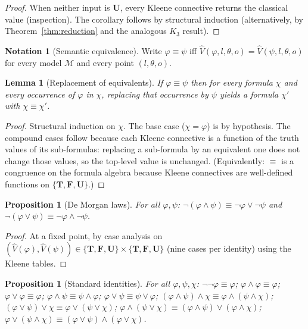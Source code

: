 \documentclass[11pt,a4paper]{article}
\theoremstyle{definition}
\newtheorem{notation}[definition]{Notation}
\theoremstyle{plain}
\newtheorem{lemma}[definition]{Lemma}
\newtheorem{proposition}[definition]{Proposition}
\theoremstyle{remark}
\newcommand{\Tv}{\mathbf{T}}
\newcommand{\Fv}{\mathbf{F}}
\newcommand{\Uv}{\mathbf{U}}
\newcommand{\Vals}{\{\Tv, \Fv, \Uv\}}
\newcommand{\Vh}{\widehat{V}}
\newcommand{\frm}{(l, \theta, o)}
\newcommand{\eqv}{\equiv}
\newcommand{\Mod}{\mathcal{M}}
\begin{document}
\begin{proof}
When neither input is $\Uv$, every Kleene connective returns the
classical value (inspection). The corollary follows by structural
induction (alternatively, by Theorem~\ref{thm:reduction} and the
analogous $K_3$ result).
\end{proof}

\begin{notation}[Semantic equivalence]
Write $\varphi \eqv \psi$ iff $\Vh(\varphi, l, \theta, o) =
\Vh(\psi, l, \theta, o)$ for every model $\Mod$ and every point $\frm$.
\end{notation}

\begin{lemma}[Replacement of equivalents]
\label{lem:replace}
If $\varphi \eqv \psi$ then for every formula $\chi$ and every occurrence
of $\varphi$ in $\chi$, replacing that occurrence by $\psi$ yields a
formula $\chi'$ with $\chi \eqv \chi'$.
\end{lemma}

\begin{proof}
Structural induction on $\chi$. The base case ($\chi = \varphi$) is by
hypothesis. The compound cases follow because each Kleene connective is
a function of the truth values of its sub-formulas: replacing a
sub-formula by an equivalent one does not change those values, so the
top-level value is unchanged. (Equivalently: $\eqv$ is a congruence on
the formula algebra because Kleene connectives are well-defined
functions on $\Vals$.)
\end{proof}

\begin{proposition}[De Morgan laws]\label{prop:demorgan}
For all $\varphi, \psi$:
$\lnot(\varphi \land \psi) \eqv \lnot\varphi \lor \lnot\psi$ and
$\lnot(\varphi \lor \psi) \eqv \lnot\varphi \land \lnot\psi$.
\end{proposition}

\begin{proof}
At a fixed point, by case analysis on
$(\Vh(\varphi), \Vh(\psi)) \in \Vals \times \Vals$ (nine cases per
identity) using the Kleene tables.
\end{proof}

\begin{proposition}[Standard identities]\label{prop:basic}
For all $\varphi, \psi, \chi$:
$\lnot\lnot\varphi \eqv \varphi$;\;
$\varphi \land \varphi \eqv \varphi$;\;
$\varphi \lor \varphi \eqv \varphi$;\;
$\varphi \land \psi \eqv \psi \land \varphi$;\;
$\varphi \lor \psi \eqv \psi \lor \varphi$;\;
$(\varphi \land \psi) \land \chi \eqv \varphi \land (\psi \land \chi)$;\;
$(\varphi \lor \psi) \lor \chi \eqv \varphi \lor (\psi \lor \chi)$;\;
$\varphi \land (\psi \lor \chi) \eqv (\varphi \land \psi) \lor (\varphi \land \chi)$;\;
$\varphi \lor (\psi \land \chi) \eqv (\varphi \lor \psi) \land (\varphi \lor \chi)$.
\end{proposition}
\end{document}
